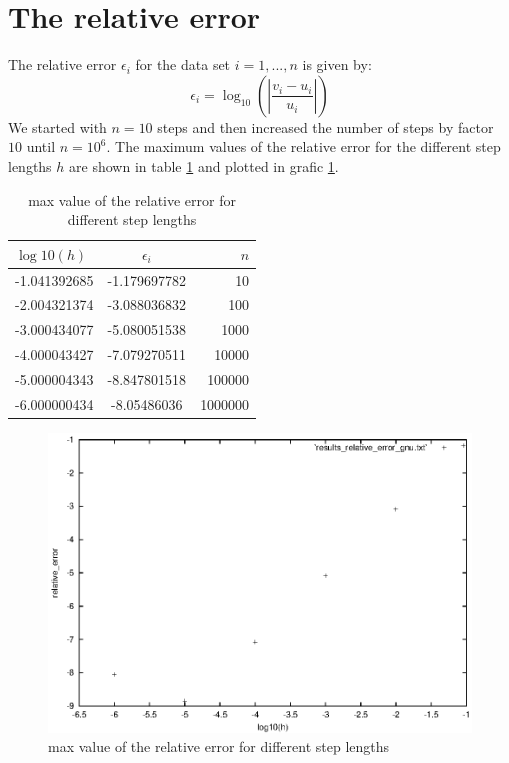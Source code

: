 \documentclass[11pt,a4wide]{article}
\begin{document}
\section{The relative error}
The relative error $\epsilon_{i}$ for the data set $ i= 1,...,n$ is given by:
\begin{equation}
\epsilon_{i} = \log_{10}\left(\left|\dfrac{v_{i}-u_{i}}{u_{i}}\right|\right)
\end{equation}
We started with $n=10$ steps and then increased the number of steps by factor $10$ until $n=10^6$. The maximum values of the relative error for the different step lengths $h$ are shown in table \ref{tab: rel. error} and plotted in grafic \ref{graf: rel. error}.
\begin{table}[b]
\centering
\caption{max value of the relative error for different step lengths}
\label{tab: rel. error}
\begin{tabular}{lcr}\hline
	$\log10(h)$ & $\epsilon_i$ & $n$ \\
	\hline
	-1.041392685 & -1.179697782 & 10 \\
  -2.004321374 & -3.088036832 & 100 \\
  -3.000434077 & -5.080051538 & 1000 \\
  -4.000043427 & -7.079270511 & 10000 \\
  -5.000004343 & -8.847801518 & 100000 \\
  -6.000000434 & -8.05486036  & 1000000 \\	
\end{tabular}
\end{table}

\begin{figure}[t]
\centering
\label{graf: rel. error}
\includegraphics [scale=1] {relerr.eps}
\caption{max value of the relative error for different step lengths}
\end{figure}
\end{document}
